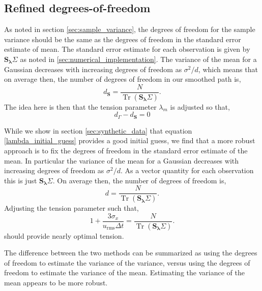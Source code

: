 \documentclass[10pt,journal]{IEEEtran}
\DeclareMathOperator{\Tr}{Tr}
\begin{document}
\subsection{Refined degrees-of-freedom} \label{refined_dof}

As noted in section \ref{sec:sample_variance}, the degrees of freedom for the sample variance should be the same as the degrees of freedom in the standard error estimate of mean. The standard error estimate for each observation is given by $\mathbf{S_\lambda} \Sigma$ as noted in \ref{sec:numerical_implementation}. The variance of the mean for a Gaussian decreases with increasing degrees of freedom as $\sigma^2/d$, which means that on average then, the number of degrees of freedom in our smoothed path is,
\begin{equation}
d_{\mathbf{S}} = \frac{N}{\Tr \left(\mathbf{S_\lambda} \Sigma \right) }.
\end{equation}
The idea here is then that the tension parameter $\lambda_m$ is adjusted so that,
\begin{equation}
d_\Gamma - d_{\mathbf{S}} = 0
\end{equation}

While we show in section \ref{sec:synthetic_data} that equation \ref{lambda_initial_guess} provides a good initial guess, we find that a more robust approach is to fix the degrees of freedom in the standard error estimate of the mean. In particular the variance of the mean for a Gaussian decreases with increasing degrees of freedom as $\sigma^2/d$. As a vector quantity for each observation this is just $\mathbf{S_\lambda} \Sigma$. On average then, the number of degrees of freedom is,
\begin{equation}
d = \frac{N}{\Tr \left(\mathbf{S_\lambda} \Sigma \right) }.
\end{equation}
Adjusting the tension parameter such that,
\begin{equation}
\label{iterated_tension}
1 + \frac{3 \sigma_x}{u_{\textrm{rms}}\Delta t} = \frac{N}{\Tr \left(\mathbf{S_\lambda} \Sigma \right) }.
\end{equation}
should provide nearly optimal tension.

The difference between the two methods can be summarized as using the degrees of freedom to estimate the variance of the variance, versus using the degrees of freedom to estimate the variance of the mean. Estimating the variance of the mean appears to be more robust.
\end{document}

